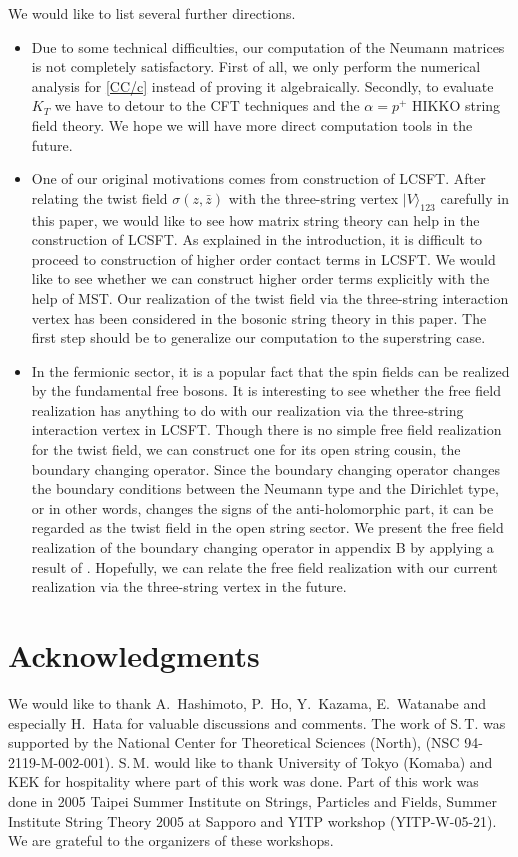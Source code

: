 \documentclass[12pt]{article}
\begin{document}
We would like to list several further directions.
\begin{itemize}
\item
Due to some technical difficulties, our computation of the Neumann
matrices is not completely satisfactory.
First of all, we only perform the numerical analysis for \eqref{CC/c}
instead of proving it algebraically.
Secondly, to evaluate $K_T$ we have to detour to the CFT techniques and
the $\alpha=p^+$ HIKKO string field theory.
We hope we will have more direct computation tools in the future.
\item
One of our original motivations comes from construction of LCSFT.
After relating the twist field $\sigma(z,\bar z)$ with the
three-string vertex $|V\rangle_{123}$ carefully in this paper, we
would like to see how matrix string theory can help in the
construction of LCSFT.
As explained in the introduction, it is difficult to proceed to
construction of higher order contact terms in LCSFT.
We would like to see whether we can construct higher order terms
explicitly with the help of MST.
Our realization of the twist field via the three-string interaction
vertex has been considered in the bosonic string theory in this
paper.
The first step should be to generalize our computation to the
superstring case.
\item
In the fermionic sector, it is a popular fact that the spin fields can
be realized by the fundamental free bosons.
It is interesting to see whether the free field realization has
anything to do with our realization via the three-string interaction
vertex in LCSFT.
Though there is no simple free field realization for the twist field,
we can construct one for its open string cousin, the boundary changing 
operator.
Since the boundary changing operator changes the boundary conditions
between the Neumann type and the Dirichlet type, or in other words,
changes the signs of the anti-holomorphic part, it can be regarded
as the twist field in the open string sector.
We present the free field realization of the boundary changing
operator in appendix B by applying a result of \cite{KT}.
Hopefully, we can relate the free field realization with our current
realization via the three-string vertex in the future.
\end{itemize}

\section*{Acknowledgments}
We would like to thank A.~Hashimoto, P.~Ho, Y.~Kazama, E.~Watanabe and
especially H.~Hata for valuable discussions and comments.
The work of S.\,T. was supported by the National Center for
Theoretical Sciences (North), (NSC 94-2119-M-002-001).
S.\,M. would like to thank University of Tokyo (Komaba) and KEK for
hospitality where part of this work was done. 
Part of this work was done in 2005 Taipei Summer Institute on Strings,
Particles and Fields, Summer Institute String Theory 2005 at Sapporo
and YITP workshop (YITP-W-05-21).
We are grateful to the organizers of these workshops.
\end{document}

